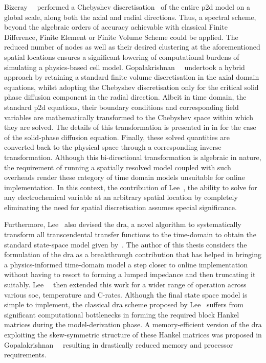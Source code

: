 Bizeray~\etal{}~\cite{Bizeray2015}         performed         a         Chebyshev
discretisation~\cite{Trefethen2000}  of   the  entire   \gls{p2d}  model   on  a
global  scale,  \ie{}  along  both   the  axial  and  radial  directions.  Thus,
a  spectral  scheme,   beyond  the  algebraic  orders   of  accuracy  achievable
with  classical  Finite  Difference,  Finite Element  or  Finite  Volume  Scheme
could  be  applied.  The reduced  number  of  nodes  as  well as  their  desired
clustering  at  the  aforementioned  spatial  locations  ensures  a  significant
lowering  of computational  burdens of  simulating a  physics-based cell  model.
Gopalakrishnan~\etal{}~\cite{Gopalakrishnan2018} undertook a  hybrid approach by
retaining a standard finite volume discretisation in the axial domain equations,
whilst adopting the  Chebyshev discretisation only for the  critical solid phase
diffusion component in the radial direction. Albeit in time domain, the standard
\gls{p2d} equations, their boundary conditions and corresponding field variables
are  mathematically transformed  to the  Chebyshev space  within which  they are
solved.  The details  of this  transformation is  presented in   in   for  the case  of the  solid-phase diffusion
equation.  Finally,   these  solved  quantities   are  converted  back   to  the
physical  space through  a corresponding  inverse transformation.  Although this
bi-directional transformation is algebraic in nature, the requirement of running
a spatially resolved model coupled with  such overheads render these category of
time domain models unsuitable for online implementation. In this context, the
contribution of Lee~\etal{}, \ie{} the ability to solve for any electrochemical
variable at an arbitrary spatial location by completely eliminating the need for
spatial discretisation assumes special significance.

Furthermore,  Lee~\etal{}   also  devised  the  \gls{dra},   a  novel  algorithm
to  systematically  transform  all  transcendental  transfer  functions  to  the
time-domain to  obtain the standard state-space  model given by~\cite{Lee2012a}.
The  author of  this thesis  considers  the formulation  of the  \gls{dra} as  a
breakthrough  contribution  that  has  helped  in  bringing  a  physics-informed
time-domain  model  a  step  closer  to  online  implementation  without  having
to  resort to  forming  a  lumped impedance  and  then  truncating it  suitably.
Lee~\etal{}~\cite{Lee2014}  then  extended  this  work  for  a  wider  range  of
operation  across  various  \gls{soc},  temperature and  C-rates.  Although  the
final  state  space  model  is  simple to  implement,  the  classical  \gls{dra}
scheme   proposed  by   Lee~\etal{}   suffers   from  significant   computational
bottlenecks  in   forming  the  required   block  Hankel  matrices   during  the
model-derivation phase.  A memory-efficient version of  the \gls{dra} exploiting
the   skew-symmetric   structure  of   these   Hankel   matrices  was   proposed
in  Gopalakrishnan~\etal{}~\cite{Gopalakrishnan2017}  resulting  in  drastically
reduced memory and processor requirements.

